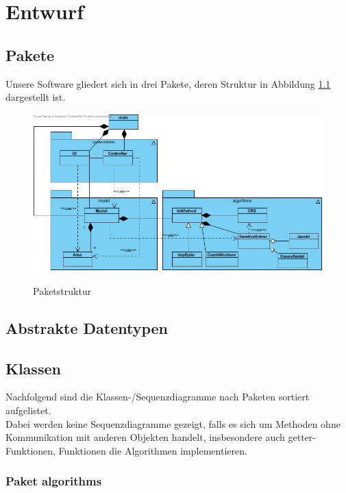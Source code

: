 \chapter{Entwurf}
\section{Pakete}
Unsere Software gliedert sich in drei Pakete, deren Struktur in Abbildung \ref{Paketdiagramm} dargestellt ist.

\begin{figure}[H]
	\centering
	\includegraphics[scale=.65]{Bilder/Paketdiagramm.jpg}\\
	\caption{Paketstruktur}
	\label{Paketdiagramm}
\end{figure}

\section{Abstrakte Datentypen}

\section{Klassen}

Nachfolgend sind die Klassen-/Sequenzdiagramme nach Paketen sortiert aufgelistet. \\
Dabei werden keine Sequenzdiagramme gezeigt, falls es sich um Methoden ohne Kommunikation mit anderen Objekten handelt, insbesondere auch getter-Funktionen, Funktionen die Algorithmen implementieren.

\subsection{Paket algorithms}

